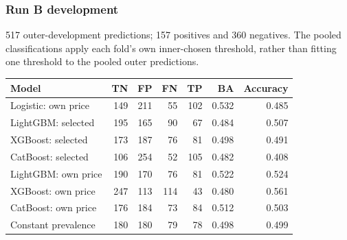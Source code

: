 \subsubsection*{Run B development}
517 outer-development predictions; 157 positives and 360 negatives. The pooled classifications apply each fold's own inner-chosen threshold, rather than fitting one threshold to the pooled outer predictions.
\begingroup\small\setlength{\tabcolsep}{3pt}
\begin{longtable}{@{}p{.35\linewidth}rrrrrr@{}}
\toprule Model & TN & FP & FN & TP & BA & Accuracy\\\midrule\endhead
Logistic: own price & 149 & 211 & 55 & 102 & 0.532 & 0.485\\
LightGBM: selected & 195 & 165 & 90 & 67 & 0.484 & 0.507\\
XGBoost: selected & 173 & 187 & 76 & 81 & 0.498 & 0.491\\
CatBoost: selected & 106 & 254 & 52 & 105 & 0.482 & 0.408\\
LightGBM: own price & 190 & 170 & 76 & 81 & 0.522 & 0.524\\
XGBoost: own price & 247 & 113 & 114 & 43 & 0.480 & 0.561\\
CatBoost: own price & 176 & 184 & 73 & 84 & 0.512 & 0.503\\
Constant prevalence & 180 & 180 & 79 & 78 & 0.498 & 0.499\\
\bottomrule\end{longtable}\endgroup
\begingroup\small\setlength{\tabcolsep}{3pt}
